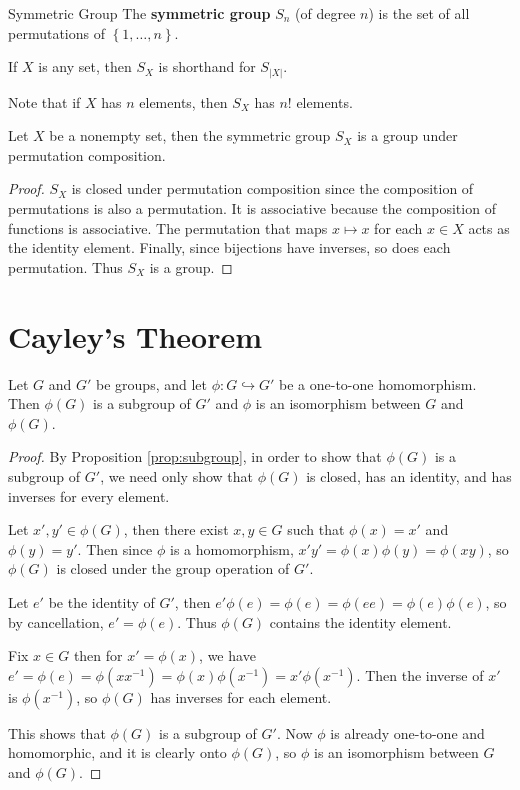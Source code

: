 \documentclass[10pt]{report}
\begin{document}
\begin{defn}{Symmetric Group}{}
The \textbf{symmetric group} $S_n$ (of degree $n$) is the set of all permutations of $\left\{ 1, \dots, n \right\}$.

If $X$ is any set, then $S_X$ is shorthand for $S_{|X|}$.
\end{defn}

Note that if $X$ has $n$ elements, then $S_X$ has $n!$ elements.

\begin{thrm}{}{}
Let $X$ be a nonempty set, then the symmetric group $S_X$ is a group under permutation composition.
\end{thrm}
\begin{proof}
	$S_X$ is closed under permutation composition since the composition of permutations is also a permutation. It is associative because the composition of functions is associative. The permutation that maps $x \mapsto x$ for each $x \in X$ acts as the identity element. Finally, since bijections have inverses, so does each permutation. Thus $S_X$ is a group.
\end{proof}


\section{Cayley's Theorem}

\begin{lem}
	Let $G$ and $G'$ be groups, and let $\phi:G \hookrightarrow  G'$ be a one-to-one homomorphism. Then $\phi(G)$ is a subgroup of $G'$ and $\phi$ is an isomorphism between $G$ and $\phi(G)$.
\end{lem}
\begin{proof}
	By Proposition \ref{prop:subgroup}, in order to show that $\phi(G)$ is a subgroup of $G'$, we need only show that $\phi(G)$ is closed, has an identity, and has inverses for every element.

	Let $x',y' \in \phi(G)$, then there exist $x,y\in G$ such that $\phi(x)=x'$ and $\phi(y)=y'$. Then since $\phi$ is a homomorphism, $x'y' = \phi(x)\phi(y) = \phi(xy)$, so $\phi(G)$ is closed under the group operation of $G'$.

	Let $e'$ be the identity of $G'$, then $e'\phi(e) = \phi(e) = \phi(ee) = \phi(e) \phi(e)$, so by cancellation, $e' = \phi(e)$. Thus $\phi(G)$ contains the identity element.

	Fix $x \in G$ then for $x'=\phi(x)$, we have $e'=\phi(e) = \phi(xx^{-1}) = \phi(x)\phi(x^{-1}) = x'\phi(x^{-1}).$ Then the inverse of $x'$ is $\phi(x^{-1})$, so $\phi(G)$ has inverses for each element.

	This shows that $\phi(G)$ is a subgroup of $G'$. Now $\phi$ is already one-to-one and homomorphic, and it is clearly onto $\phi(G)$, so $\phi$ is an isomorphism between $G$ and $\phi(G)$.
\end{proof}
\end{document}
